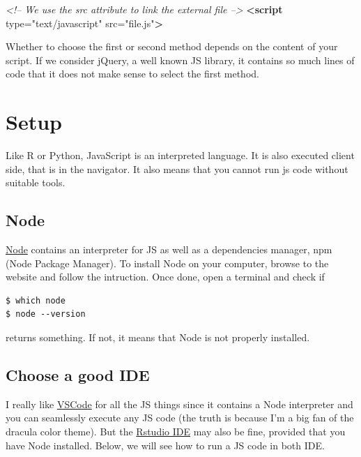 \documentclass[]{book}
\newenvironment{Shaded}{\begin{snugshade}}{\end{snugshade}}
\newcommand{\CommentTok}[1]{\textcolor[rgb]{0.56,0.35,0.01}{\textit{#1}}}
\newcommand{\KeywordTok}[1]{\textcolor[rgb]{0.13,0.29,0.53}{\textbf{#1}}}
\newcommand{\OtherTok}[1]{\textcolor[rgb]{0.56,0.35,0.01}{#1}}
\newcommand{\StringTok}[1]{\textcolor[rgb]{0.31,0.60,0.02}{#1}}
\begin{document}
\begin{Shaded}
\begin{Highlighting}[]
\CommentTok{<!-- We use the src attribute to link the external file -->}
\KeywordTok{<script}\OtherTok{ type=}\StringTok{"text/javascript"}\OtherTok{ src=}\StringTok{"file.js"}\KeywordTok{>}
\end{Highlighting}
\end{Shaded}

Whether to choose the first or second method depends on the content of your script. If we consider jQuery, a well known JS library, it contains so much lines of code that it does not make sense to select the first method.

\hypertarget{setup}{%
\section{Setup}\label{setup}}

Like R or Python, JavaScript is an interpreted language. It is also executed client side, that is in the navigator. It also means that you cannot run js code without suitable tools.

\hypertarget{node}{%
\subsection{Node}\label{node}}

\href{https://nodejs.org/en/}{Node} contains an interpreter for JS as well as a dependencies manager, npm (Node Package Manager). To install Node on your computer, browse to the website and follow the intruction. Once done, open a terminal and check if

\begin{verbatim}
$ which node
$ node --version
\end{verbatim}

returns something. If not, it means that Node is not properly installed.

\hypertarget{choose-a-good-ide}{%
\subsection{Choose a good IDE}\label{choose-a-good-ide}}

I really like \href{https://code.visualstudio.com}{VSCode} for all the JS things since it contains a Node interpreter and you can seamlessly execute any JS code (the truth is because I'm a big fan of the dracula color theme). But the \href{https://rstudio.com/products/rstudio/}{Rstudio IDE} may also be fine, provided that you have Node installed. Below, we will see how to run a JS code in both IDE.
\end{document}
